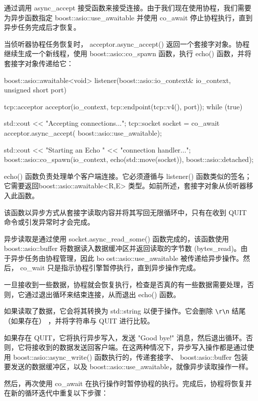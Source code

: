 通过调用 async\_accept 接受函数来接受连接。由于我们现在使用协程，我们需要为异步函数指定 boost::asio::use\_awaitable 并使用 co\_await 停止协程执行，直到异步任务完成后才恢复。

当侦听器协程任务恢复时， acceptor.async\_accept() 返回一个套接字对象。协程继续生成一个新线程，使用 boost::asio::co\_spawn 函数，执行 echo() 函数，并将套接字对象传递给它：

\begin{cpp}
boost::asio::awaitable<void> listener(boost::asio::io_context& io_context, unsigned short port) {
    tcp::acceptor acceptor(io_context,
                           tcp::endpoint(tcp::v4(), port));
    while (true) {
        std::cout << "Accepting connections...\n";
        tcp::socket socket = co_await
            acceptor.async_accept(
                boost::asio::use_awaitable);

        std::cout << "Starting an Echo "
                  << "connection handler...\n";
        boost::asio::co_spawn(io_context,
                              echo(std::move(socket)),
                              boost::asio::detached);
    }
}
\end{cpp}

echo() 函数负责处理单个客户端连接。它必须遵循与 listener() 函数类似的签名；它需要返回boost::asio::awaitable<R,E> 类型。如前所述，套接字对象从侦听器移入此函数。

该函数以异步方式从套接字读取内容并将其写回无限循环中，只有在收到 QUIT 命令或引发异常时才会完成。

异步读取是通过使用 socket.async\_read\_some() 函数完成的，该函数使用 boost::asio::buffer 将数据读入数据缓冲区并返回读取的字节数 (bytes\_read)。由于异步任务由协程管理，因此 bo ost::asio::use\_awaitable 被传递给异步操作。然后， co\_wait 只是指示协程引擎暂停执行，直到异步操作完成。

一旦接收到一些数据，协程就会恢复执行，检查是否真的有一些数据需要处理，否则，它通过退出循环来结束连接，从而退出 echo() 函数。

如果读取了数据，它会将其转换为 std::string 以便于操作。它会删除 \verb|\r\n| 结尾（如果存在） ，并将字符串与 QUIT 进行比较。

如果存在 QUIT，它将执行异步写入，发送 "Good bye!" 消息，然后退出循环。否则，它将接收到的数据发送回客户端。在这两种情况下，异步写入操作都是通过使用 boost::asio::async\_write() 函数执行的，传递套接字、 boost:asio::buffer 包装要发送的数据缓冲区，以及 boost::asio::use\_awaitable，就像异步读取操作一样。

然后，再次使用 co\_await 在执行操作时暂停协程的执行。完成后，协程将恢复并在新的循环迭代中重复以下步骤：

